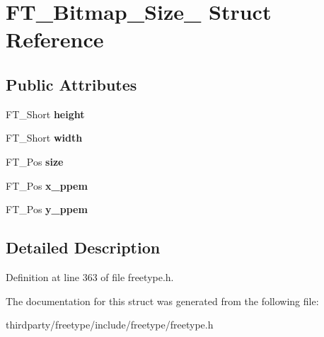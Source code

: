 \hypertarget{struct_f_t___bitmap___size__}{}\section{F\+T\+\_\+\+Bitmap\+\_\+\+Size\+\_\+ Struct Reference}
\label{struct_f_t___bitmap___size__}
\subsection*{Public Attributes}
\begin{DoxyCompactItemize}
\item 
\mbox{\label{struct_f_t___bitmap___size___adf2f24039b458ff4674712886f242262}} 
F\+T\+\_\+\+Short {\bfseries height}
\item 
\mbox{\label{struct_f_t___bitmap___size___ab9da94223f75a89a649d1e6d018b17f1}} 
F\+T\+\_\+\+Short {\bfseries width}
\item 
\mbox{\label{struct_f_t___bitmap___size___a1db23a6220fb6bcb712430821a6e5352}} 
F\+T\+\_\+\+Pos {\bfseries size}
\item 
\mbox{\label{struct_f_t___bitmap___size___a6f877a792d2dc93328037c928979215f}} 
F\+T\+\_\+\+Pos {\bfseries x\+\_\+ppem}
\item 
\mbox{\label{struct_f_t___bitmap___size___a60d4d003d09fd57505f69f39e31e19c1}} 
F\+T\+\_\+\+Pos {\bfseries y\+\_\+ppem}
\end{DoxyCompactItemize}


\subsection{Detailed Description}


Definition at line 363 of file freetype.\+h.



The documentation for this struct was generated from the following file\+:\begin{DoxyCompactItemize}
\item 
thirdparty/freetype/include/freetype/freetype.\+h\end{DoxyCompactItemize}
